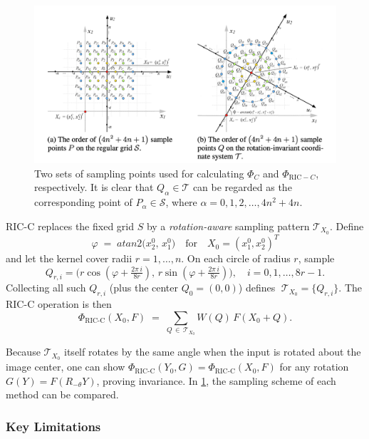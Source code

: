 \begin{figure}
    \centering
    \includegraphics[width=1.0\linewidth]{pics/ric_sample.png}
    \caption{Two sets of sampling points used for calculating $\Phi_C$ and $\Phi_{\mathrm{RIC}-C}$, respectively. It is clear that $Q_\alpha\in\mathcal T$ can be regarded as the corresponding point of $P_\alpha\in\mathcal S$, where $\alpha=0,1,2,\dots,4n^2+4n$.}
    \label{fig:ric_sample}
\end{figure}
RIC-C replaces the fixed grid \(S\) by a \emph{rotation-aware} sampling pattern \(\mathcal T_{X_0}\).  Define
\[
\varphi \;=\;atan2\bigl(x^0_2,\,x^0_1\bigr)
\quad\text{for}\quad
X_0=(x^0_1,x^0_2)^T
\]
and let the kernel cover radii \(r=1,\dots,n\).  On each circle of radius \(r\), sample
\begin{equation}
Q_{r,i}
=
\bigl(r\cos(\varphi + \tfrac{2\pi\,i}{8r}),\,r\sin(\varphi + \tfrac{2\pi\,i}{8r})\bigr),
\quad
i=0,1,\dots,8r-1.
\label{eq:ric_points}
\end{equation}
Collecting all such \(Q_{r,i}\) (plus the center \(Q_{0}=(0,0)\)) defines
\(\;\mathcal T_{X_0}=\{Q_{r,i}\}\).
The RIC-C operation is then
\begin{equation}
\Phi_{\mathrm{RIC\text{-}C}}(X_0, F)
\;=\;
\sum_{Q \,\in\, \mathcal T_{X_0}} W(Q)\,F(X_0 + Q).
\label{eq:ric_conv}
\end{equation}

\noindent
Because \(\mathcal T_{X_0}\) itself rotates by the same angle when the input is rotated about the image center, one can show
\(\Phi_{\mathrm{RIC\text{-}C}}(Y_0,G) = \Phi_{\mathrm{RIC\text{-}C}}(X_0,F)\)
for any rotation \(G(Y) = F(R_{-\theta} Y)\), proving invariance. In \ref{fig:ric_sample}, the sampling scheme of each method can be compared.

\subsubsection*{Key Limitations}

